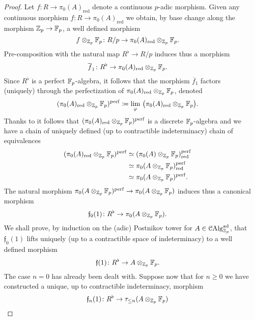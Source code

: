 \documentclass[10pt,a4paper]{amsart}
\numberwithin{equation}{subsection}
\theoremstyle{definition}
\def\lim{\mathrm{lim}}
\begin{document}
\begin{proof}
    Let $f \colon R \to \pi_0(A)_\mathrm{red}$ denote a continuous $p$-adic morphism. Given any continuous morphism $f \colon R \to \pi_0(A)_\mathrm{red}$ we obtain, by base change along the morphism $\mathbb Z_p \to \mathbb F_p$, a well defined morphism
        \[
            f \otimes_{\mathbb Z_p} \mathbb F_p \colon R/p \to \pi_0(A)_{\mathrm{red}} \otimes_{\mathbb Z_p} \mathbb F_p . 
        \]
    Pre-composition with the natural map $R^\flat \to R/p$ induces thus a morphism
        \[
            \overline{f}_1 \colon R^\flat \to \pi_0(A)_{\mathrm{red}} \otimes_{\mathbb Z_p} \mathbb F_p.  
        \]
    Since $R^\flat $ is a perfect $\mathbb F_p$-algebra, it follows that the morphism $\overline{f}_1$ factors (uniquely) through the perfectization of  $\pi_0(A)_{\mathrm{red}} \otimes_{\mathbb Z_p} \mathbb F_p$,
    denoted 
        \[
            ( \pi_0(A)_\red \otimes_{\bZp} \bF_p)^{\mathrm{perf}} \coloneqq \underset{\varphi}{\lim} \ \big( \pi_0(A)_\red \otimes_{\bZp} \bF_p \big).
        \]
    Thanks to \cite[Proposition 11.6]{bhatt2017projectivity} it follows that $( \pi_0(A)_{\mathrm{red}} \otimes_{\mathbb Z_p} \mathbb F_p)^{\mathrm{perf}}$ is a discrete $\mathbb F_p$-algebra and we have a chain of uniquely defined (up to contractible indeterminacy) chain of equivalences
        \begin{align}
            ( \pi_0(A)_{\mathrm{red}} \otimes_{\mathbb Z_p} \mathbb F_p)^{\mathrm{perf}} & \simeq (\pi_0(A) \otimes_{\mathbb Z_p} \mathbb F_p)_{\mathrm{red}}^\mathrm{perf} \\
                                                                  &   \simeq \pi_0(A \otimes_{\mathbb Z_p} \mathbb F_p)_{\mathrm{red}}^\mathrm{perf} \\
                                                                  &    \simeq \pi_0(A \otimes_{\mathbb Z_p} \mathbb F_p)^{\mathrm{perf}}.
        \end{align}
    The natural morphism $\pi_0(A \otimes_{\mathbb Z_p} \mathbb F_p)^{\mathrm{perf}} \to \pi_0(A \otimes_{\mathbb Z_p} \mathbb F_p)$ induces thus a canonical morphism
        \[
                \mathfrak{f}_0(1) \colon R^\flat \to \pi_0(A \otimes_{\mathbb Z_p} \mathbb F_p).
        \]  
    We shall prove, by induction on the (adic) Postnikov tower for $A \in \mathcal C \mathrm{Alg}^{\mathrm{ad}}_{\mathbb Z_p}$, that $\mathfrak{f}_0(1)$ lifts uniquely (up to a contractible space of indeterminacy) to a well defined morphism
        \[
            \mathfrak{f}(1) \colon R^\flat \to A \otimes_{\mathbb Z_p} \mathbb F_p.
        \]
    The case $n=0$ has already been dealt with. Suppose now that for $n \geq 0$ we have constructed a unique, up to contractible indeterminacy, morphism
        \[
            \mathfrak{f}_n(1) \colon R^\flat \to \tau_{\leq n} ( A \otimes_{\mathbb Z_p} \mathbb F_p)  
\]
\end{proof}
\end{document}
